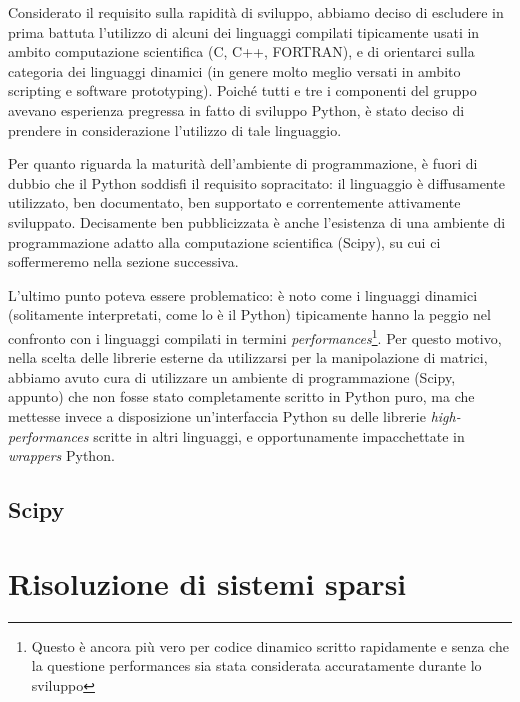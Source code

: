 \documentclass[11pt,a4paper]{scrartcl}
\begin{document}
Considerato il requisito sulla rapidità di sviluppo, abbiamo deciso di escludere in prima battuta l'utilizzo di alcuni dei linguaggi compilati tipicamente usati in ambito computazione scientifica (C, C++, FORTRAN), e di orientarci sulla categoria dei linguaggi dinamici (in genere molto meglio versati in ambito scripting e software prototyping). Poiché tutti e tre i componenti del gruppo avevano esperienza pregressa in fatto di sviluppo Python, è stato deciso di prendere in considerazione l'utilizzo di tale linguaggio.

Per quanto riguarda la maturità dell'ambiente di programmazione, è fuori di dubbio che il Python soddisfi il requisito sopracitato: il linguaggio è diffusamente utilizzato, ben documentato, ben supportato e correntemente attivamente sviluppato. Decisamente ben pubblicizzata è anche l'esistenza di una ambiente di programmazione adatto alla computazione scientifica (Scipy), su cui ci soffermeremo nella sezione successiva. 

L'ultimo punto poteva essere problematico: è noto come i linguaggi dinamici (solitamente interpretati, come lo è il Python) tipicamente hanno la peggio nel confronto con i linguaggi compilati in termini \emph{performances}\footnote{Questo è ancora più vero per codice dinamico scritto rapidamente e senza che la questione performances sia stata considerata accuratamente durante lo sviluppo}. Per questo motivo, nella scelta delle librerie esterne da utilizzarsi per la manipolazione di matrici, abbiamo avuto cura di utilizzare un ambiente di programmazione (Scipy, appunto) che non fosse stato completamente scritto in Python puro, ma che mettesse invece a disposizione un'interfaccia Python su delle librerie \emph{high-performances} scritte in altri linguaggi, e opportunamente impacchettate in \emph{wrappers} Python.



\subsection*{Scipy}


\section*{Risoluzione di sistemi sparsi}
\end{document}
